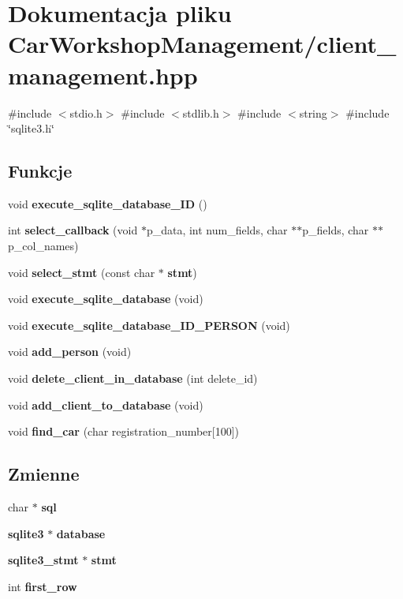 \section{Dokumentacja pliku Car\+Workshop\+Management/client\+\_\+management.hpp}
\label{client__management_8hpp}
{\ttfamily \#include $<$stdio.\+h$>$}\newline
{\ttfamily \#include $<$stdlib.\+h$>$}\newline
{\ttfamily \#include $<$string$>$}\newline
{\ttfamily \#include \char`\"{}sqlite3.\+h\char`\"{}}\newline
\subsection*{Funkcje}
\begin{DoxyCompactItemize}
\item 
void \textbf{ execute\+\_\+sqlite\+\_\+database\+\_\+\+ID} ()
\item 
int \textbf{ select\+\_\+callback} (void $\ast$p\+\_\+data, int num\+\_\+fields, char $\ast$$\ast$p\+\_\+fields, char $\ast$$\ast$p\+\_\+col\+\_\+names)
\item 
void \textbf{ select\+\_\+stmt} (const char $\ast$\textbf{ stmt})
\item 
void \textbf{ execute\+\_\+sqlite\+\_\+database} (void)
\item 
void \textbf{ execute\+\_\+sqlite\+\_\+database\+\_\+\+I\+D\+\_\+\+P\+E\+R\+S\+ON} (void)
\item 
void \textbf{ add\+\_\+person} (void)
\item 
void \textbf{ delete\+\_\+client\+\_\+in\+\_\+database} (int delete\+\_\+id)
\item 
void \textbf{ add\+\_\+client\+\_\+to\+\_\+database} (void)
\item 
void \textbf{ find\+\_\+car} (char registration\+\_\+number[100])
\end{DoxyCompactItemize}
\subsection*{Zmienne}
\begin{DoxyCompactItemize}
\item 
char $\ast$ \textbf{ sql}
\item 
\textbf{ sqlite3} $\ast$ \textbf{ database}
\item 
\textbf{ sqlite3\+\_\+stmt} $\ast$ \textbf{ stmt}
\item 
int \textbf{ first\+\_\+row}
\end{DoxyCompactItemize}


